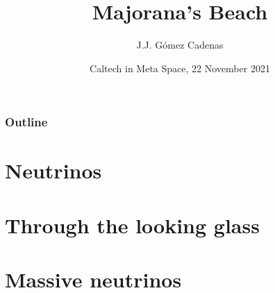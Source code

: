 \documentclass[9pt]{beamer}
\title{Majorana's Beach}
\author{J.J. G\'omez Cadenas}
\institute{Donostia International Physics Center (DIPC)} %
\date[November 22, 2021] %
{Caltech in Meta Space, 22 November 2021}
\begin{document}
\titlepage

\begin{frame}
\frametitle{Outline}
\tableofcontents
\end{frame}

\section{Neutrinos}

%
%

\section{Through the looking glass}
%

\section{Massive neutrinos}


%
%
%
%

%

%

%

%
%


%
%
\end{document}
